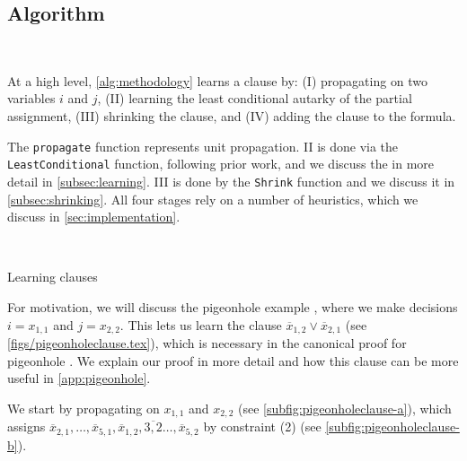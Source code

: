 \subsection{Algorithm}~\label{subsec:methodology}


At a high level, \autoref{alg:methodology} learns a \pr clause by: (I) propagating on two variables $i$ and $j$, (II) learning the least conditional autarky of the partial assignment, (III) shrinking the clause, and (IV) adding the clause to the formula. 

The \texttt{propagate} function represents unit propagation. II is done via the \texttt{LeastConditional} function, following prior work, and we discuss the  in more detail in \autoref{subsec:learning}. III is done by the \texttt{Shrink} function and we discuss it in \autoref{subsec:shrinking}. All four stages rely on a number of heuristics, which we discuss in \autoref{sec:implementation}.

\begin{algorithm}~\label{alg:methodology}
    \caption{Learning \pr clauses}\label{alg:methodology}
    \SetAlgoNoLine
\end{algorithm}

For motivation, we will discuss the pigeonhole example , where we make decisions $i = x_{1, 1}$ and $j = x_{2, 2}$. This lets us learn the clause $\overline{x}_{1, 2} \lor \overline{x}_{2, 1}$ (see \autoref{figs/pigeonholeclause.tex}), which is necessary in the canonical \pr proof for pigeonhole \cite{prclauses}. We explain our proof in more detail and how this clause can be more useful in \autoref{app:pigeonhole}.


We start by propagating on $x_{1, 1}$ and $x_{2, 2}$ (see \autoref{subfig:pigeonholeclause-a}), which assigns $\overline{x}_{2, 1}, \ldots, \overline{x}_{5, 1}, \overline{x}_{1, 2}, \overline{3, 2} \ldots, \overline{x}_{5, 2}$ by constraint (2) (see \autoref{subfig:pigeonholeclause-b}).

